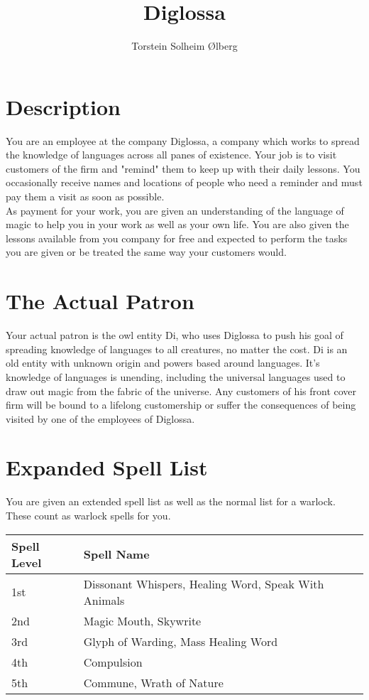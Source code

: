 \documentclass[11pt, A4paper, english]{article}
\author{Torstein Solheim Ølberg}
\title{Diglossa}
\begin{document}
	\maketitle
	
	\section*{Description}
You are an employee at the company Diglossa, a company which works to spread the knowledge of languages across all panes of existence. Your job is to visit customers of the firm and "remind" them to keep up with their daily lessons. You occasionally receive names and locations of people who need a reminder and must pay them a visit as soon as possible. \\
As payment for your work, you are given an understanding of the language of magic to help you in your work as well as your own life. You are also given the lessons available from you company for free and expected to perform the tasks you are given or be treated the same way your customers would.

	\section*{The Actual Patron}
Your actual patron is the owl entity Di, who uses Diglossa to push his goal of spreading knowledge of languages to all creatures, no matter the cost. Di is an old entity with unknown origin and powers based around languages. It's knowledge of languages is unending, including the universal languages used to draw out magic from the fabric of the universe. Any customers of his front cover firm will be bound to a lifelong customership or suffer the consequences of being visited by one of the employees of Diglossa.

	\section*{Expanded Spell List}
You are given an extended spell list as well as the normal list for a warlock. These count as warlock spells for you. \\
		\begin{tabular}{|l|l|}
\hline
Spell Level & Spell Name \\
\hline
1st & Dissonant Whispers, Healing Word, Speak With Animals \\
2nd & Magic Mouth, Skywrite \\
3rd & Glyph of Warding, Mass Healing Word \\
4th & Compulsion \\
5th & Commune, Wrath of Nature \\
\hline
		\end{tabular}
\end{document}
